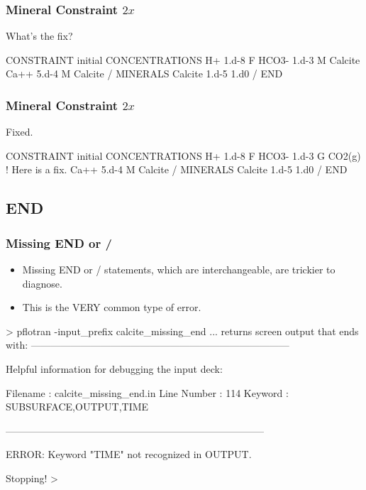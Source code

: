 \documentclass[aspectratio=169]{beamer}
\newcommand\gehcomment[1]{{{\color{orange} #1}}}
\newcommand\redcomment[1]{{{\color{red} #1}}}
\newcommand\bluecomment[1]{{{\color{blue} #1}}}
\newcommand\greencomment[1]{{{\color{green} #1}}}
\newcommand\magentacomment[1]{{{\color{magenta} #1}}}
\begin{document}
\begin{frame}\frametitle{Mineral Constraint ${2x}$}
\redcomment{What's the fix?}
\begin{semiverbatim}

CONSTRAINT initial
  CONCENTRATIONS
    H+     1.d-8      F
    HCO3-  1.d-3      M  Calcite
    Ca++   5.d-4      M  Calcite
  /
  MINERALS
    Calcite 1.d-5 1.d0
  /
END
\end{semiverbatim}

\end{frame}

\begin{frame}\frametitle{Mineral Constraint ${2x}$}

\redcomment{Fixed.}
\begin{semiverbatim}

CONSTRAINT initial
  CONCENTRATIONS
    H+     1.d-8      F
    HCO3-  1.d-3      \magentacomment{G  CO2(g)} \bluecomment{! Here is a fix.}
    Ca++   5.d-4      M  Calcite
  /
  MINERALS
    Calcite 1.d-5 1.d0
  /
END
\end{semiverbatim}

\end{frame}

\subsection{END}

\begin{frame}\frametitle{Missing \greencomment{END} or \greencomment{/}}
\small
\begin{itemize}
\item Missing \greencomment{END} or  \greencomment{/} statements, which are interchangeable,  are trickier to diagnose.
\item This is the VERY common type of error.
\end{itemize}
\footnotesize
\begin{semiverbatim}
> pflotran -input_prefix calcite_missing_end
... \gehcomment{returns screen output that ends with:}
   ------------------------------------------------------------------------------

   Helpful information for debugging the input deck:

       Filename : calcite_missing_end.in
    Line Number : 114
        Keyword : SUBSURFACE,OUTPUT,TIME

   ------------------------------------------------------------------------------

  ERROR: Keyword "TIME" not recognized in OUTPUT.

  Stopping!
>
\end{semiverbatim}

\end{frame}
\end{document}
